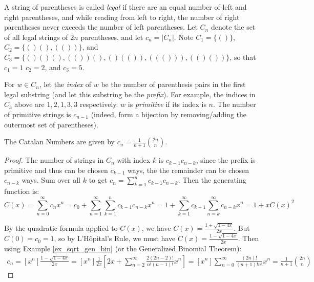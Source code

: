\documentclass[a4paper]{article}
\begin{document}
\begin{definition}
A string of parentheses is called \emph{legal} if there are an equal number of left and right parentheses, and while reading from left to right, the number of right parentheses never exceeds the number of left parentheses. Let $C_n$ denote the set of all legal strings of $2n$ parentheses, and let $c_n=|C_n|$. Note $C_1=\{()\}$, $C_2=\{()(),(())\}$, and $C_3=\{()()(),(())(),()(()),((())),(()())\}$, so that $c_1=1$ $c_2=2$, and $c_3=5$.

\medskip

For $w\in C_n$, let the \emph{index} of $w$ be the number of parenthesis pairs in the first legal substring (and let this substring be the \emph{prefix}). For example, the indices in $C_3$ above are $1,2,1,3,3$ respectively. $w$ is \emph{primitive} if its index is $n$. The number of primitive strings is $c_{n-1}$ (indeed, form a bijection by removing/adding the outermost set of parentheses).
\end{definition}

\begin{theorem}
The Catalan Numbers are given by $c_n=\frac1{n+1}\binom{2n}n$.

\begin{hl}
\begin{proof}
The number of strings in $C_n$ with index $k$ is $c_{k-1}c_{n-k}$, since the prefix is primitive and thus can be chosen $c_{k-1}$ ways, the the remainder can be chosen $c_{n-k}$ ways. Sum over all $k$ to get $c_n=\sum_{k=1}^nc_{k-1}c_{n-k}$. Then the generating function is:
\begin{equation*}
C(x)
=\sum_{n=0}^\infty c_nx^n
=c_0+\sum_{n=1}^\infty\sum_{k=1}^nc_{k-1}c_{n-k}x^n
=1+\sum_{k=1}^\infty c_{k-1}\sum_{n=k}^\infty c_{n-k}x^n
=1+xC(x)^2
\end{equation*}

By the quadratic formula applied to $C(x)$, we have $C(x)=\frac{1\pm\sqrt{1-4x}}{2x}$. But $C(0)=c_0=1$, so by L'H\^opital's Rule, we must have $C(x)=\frac{1-\sqrt{1-4x}}{2x}$. Then using Example \ref{ex_sqrt_gen_bin} (or the Generalized Binomial Theorem):
\begin{align*}
c_n
=[x^n]\frac{1-\sqrt{1-4x}}{2x}
=[x^n]\frac1{2x}\left[2x+\sum_{n=2}^\infty\frac{2(2n-2)!}{n!(n-1)!}x^n\right]
=[x^n]\sum_{n=0}^\infty\frac{(2n)!}{(n+1)!n!}x^n
=\frac1{n+1}\binom{2n}n
\end{align*}
\end{proof}
\end{hl}
\end{theorem}
\end{document}

